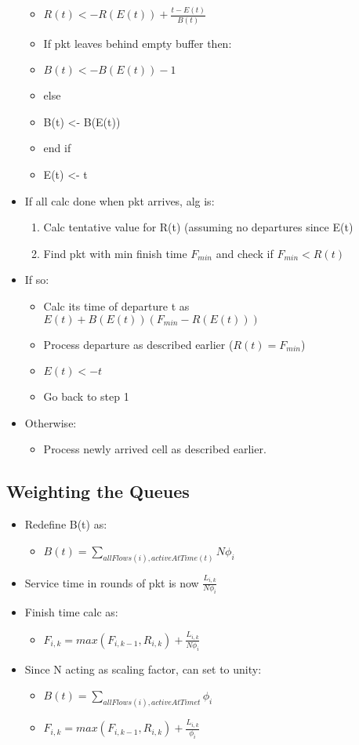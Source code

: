 \begin{itemize}
	\begin{itemize}
		\item $R(t) <- R(E(t))+\frac{t-E(t)}{B(t)}$
		\item If pkt leaves behind empty buffer then:
		\item $B(t) <- B(E(t)) - 1$
		\item else
		\item B(t) <- B(E(t))
		\item end if
		\item E(t) <- t
	\end{itemize}
	\item If all calc done when pkt arrives, alg is:
	\begin{enumerate}
		\item Calc tentative value for R(t) (assuming no departures
			since E(t)
		\item Find pkt with min finish time $F_{min}$ and check if
			$F_{min}< R(t)$
	\end{enumerate}
	\item If so:
	\begin{itemize}
		\item Calc its time of departure t as
			$E(t)+B(E(t))(F_{min}-R(E(t)))$
		\item Process departure as described earlier ($R(t)=F_{min}$)
		\item $E(t)<-t$
		 \item Go back to step 1
	\end{itemize}
	\item Otherwise:
	\begin{itemize}
		\item Process newly arrived cell as described earlier.
	\end{itemize}
\end{itemize}

\subsection{Weighting the Queues}

\begin{itemize}
	\item Redefine B(t) as:
	\begin{itemize}
		\item $B(t)=\sum_{all Flows (i),active At Time (t)}^{} N\phi_i$
	\end{itemize}
	\item Service time in rounds of pkt is now $\frac{L_{i,k}}{N\phi_i}$
	\item Finish time calc as:
	\begin{itemize}
		\item $F_{i,k}=max(F_{i,k-1},R_{i,k})+\frac{L_{i,k}}{N\phi_i}$
	\end{itemize}
	\item Since N acting as scaling factor, can set to unity:
	\begin{itemize}
		\item $B(t) = \sum_{all Flows (i), active At Time t}^{} \phi_i$
		\item $F_{i,k}=max(F_{i,k-1},R_{i,k}) + \frac{L_{i,k}}{\phi_i}$
	\end{itemize}
\end{itemize}
